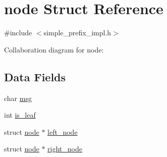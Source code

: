 \hypertarget{structnode}{\section{node Struct Reference}
\label{structnode}
}


{\ttfamily \#include $<$simple\-\_\-prefix\-\_\-impl.\-h$>$}



Collaboration diagram for node\-:
\subsection*{Data Fields}
\begin{DoxyCompactItemize}
\item 
char \hyperlink{structnode_ad80e777cd260fdd5ca6ad3f25b5e76de}{msg}
\item 
int \hyperlink{structnode_ad066657fe1374fb9852c285175a3774f}{is\-\_\-leaf}
\item 
struct \hyperlink{structnode}{node} $\ast$ \hyperlink{structnode_a43dd3cf499d5b2270fcfbb29eb0a0d66}{left\-\_\-node}
\item 
struct \hyperlink{structnode}{node} $\ast$ \hyperlink{structnode_af729d9e66cefdd8c0a114cb0da5f7b7c}{right\-\_\-node}
\end{DoxyCompactItemize}


